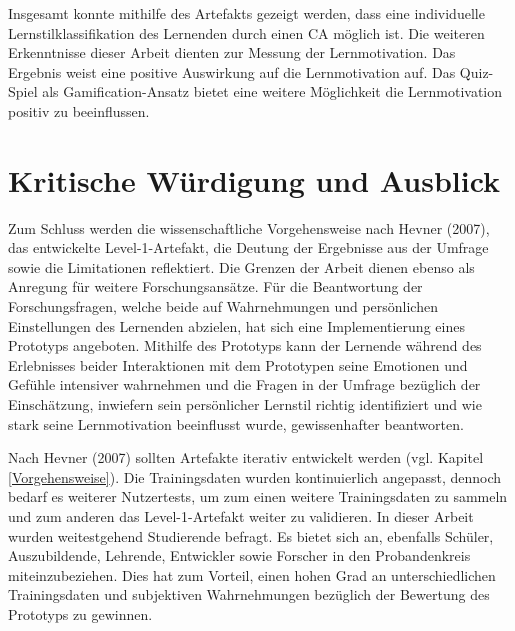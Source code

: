 Insgesamt konnte mithilfe des Artefakts gezeigt werden, dass eine individuelle Lernstilklassifikation des Lernenden 
durch einen CA möglich ist. Die weiteren Erkenntnisse dieser Arbeit dienten zur Messung der Lernmotivation. Das Ergebnis 
weist eine positive Auswirkung auf die Lernmotivation auf. Das Quiz-Spiel als Gamification-Ansatz
bietet eine weitere Möglichkeit die Lernmotivation positiv zu beeinflussen.

\section{Kritische Würdigung und Ausblick}

Zum Schluss werden die wissenschaftliche Vorgehensweise nach Hevner (2007), das entwickelte Level-1-Artefakt,
die Deutung der Ergebnisse aus der Umfrage sowie die Limitationen reflektiert. Die Grenzen der Arbeit dienen 
ebenso als Anregung für weitere Forschungsansätze.
Für die Beantwortung der Forschungsfragen, welche beide auf Wahrnehmungen und persönlichen Einstellungen
des Lernenden abzielen, hat sich eine Implementierung eines Prototyps angeboten. Mithilfe des Prototyps kann der 
Lernende während des Erlebnisses beider Interaktionen mit dem Prototypen seine Emotionen und Gefühle 
intensiver wahrnehmen und die Fragen in der Umfrage bezüglich der Einschätzung, inwiefern sein persönlicher Lernstil 
richtig identifiziert und wie stark seine Lernmotivation beeinflusst wurde, gewissenhafter beantworten.

Nach Hevner (2007) sollten Artefakte iterativ entwickelt werden (vgl. Kapitel \ref{Vorgehensweise}). Die Trainingsdaten wurden kontinuierlich angepasst, dennoch 
bedarf es weiterer Nutzertests, um zum einen weitere Trainingsdaten zu sammeln und zum anderen das Level-1-Artefakt weiter zu validieren.
In dieser Arbeit wurden weitestgehend Studierende befragt. Es bietet sich an, ebenfalls Schüler, Auszubildende, Lehrende, 
Entwickler sowie Forscher in den Probandenkreis miteinzubeziehen.
Dies hat zum Vorteil, einen hohen Grad an unterschiedlichen Trainingsdaten und subjektiven Wahrnehmungen bezüglich der 
Bewertung des Prototyps zu gewinnen.

